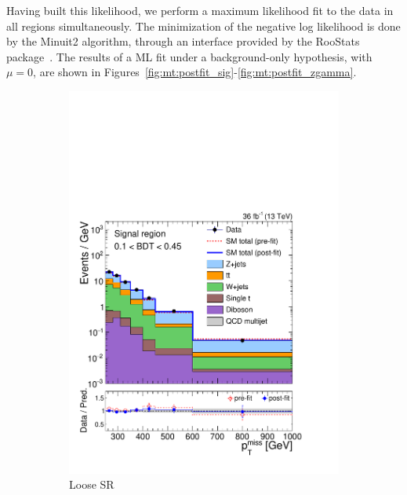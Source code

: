 Having built this likelihood, we perform a maximum likelihood fit to the data in all regions simultaneously.
The minimization of the negative log likelihood is done by the Minuit2 algorithm, through an interface provided by the RooStats package~\cite{roostats}.
The results of a ML fit under a background-only hypothesis, with $\mu = 0$, are shown in Figures~\ref{fig:mt:postfit_sig}-\ref{fig:mt:postfit_zgamma}.

\begin{figure}[]
    \begin{center}
        \begin{subfigure}[t]{0.49\textwidth}
            \includegraphics[width=\textwidth]{figures/monotop/postfit/stackedPostfit_signal_monotop_loose.pdf}
            \caption{Loose SR}
        \end{subfigure}
        \begin{subfigure}[t]{0.49\textwidth}

\end{subfigure}
\end{center}
\end{figure}
